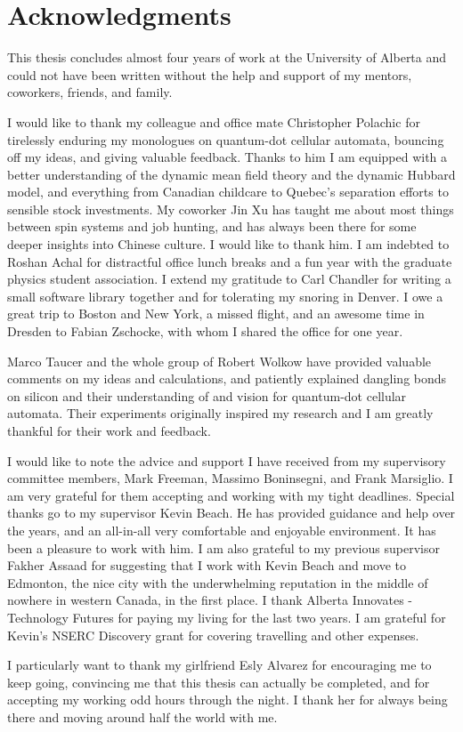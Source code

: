 \chapter*{Acknowledgments}

This thesis concludes almost four years of work at the University of
Alberta and could not have been written without the help and support of my
mentors, coworkers, friends, and family.

I would like to thank my colleague and office mate Christopher Polachic for
tirelessly enduring my monologues on quantum-dot cellular automata, bouncing off
my ideas, and giving valuable feedback. Thanks to him I am equipped with a
better understanding of the dynamic mean field theory and the dynamic Hubbard
model, and everything from Canadian childcare to Quebec's separation efforts to
sensible stock investments.  My coworker Jin Xu has taught me about most things
between spin systems and job hunting, and has always been there for some deeper
insights into Chinese culture. I would like to thank him. I am indebted to
Roshan Achal for distractful office lunch breaks and a fun year with the
graduate physics student association. I extend my gratitude to Carl Chandler for
writing a small software library together and for tolerating my snoring in
Denver. I owe a great trip to Boston and New York, a missed flight, and an
awesome time in Dresden to Fabian Zschocke, with whom I shared the office for
one year.

Marco Taucer and the whole group of Robert Wolkow have provided valuable
comments on my ideas and calculations, and patiently explained dangling
bonds on silicon and their understanding of and vision for quantum-dot cellular
automata. Their experiments originally inspired my research and I am
greatly thankful for their work and feedback.

I would like to note the advice and support I have received from my supervisory
committee members, Mark Freeman, Massimo Boninsegni, and Frank Marsiglio. I am
very grateful for them accepting and working with my tight deadlines. Special
thanks go to my supervisor Kevin Beach. He has provided guidance and help over
the years, and an all-in-all very comfortable and enjoyable environment. It has
been a pleasure to work with him. I am also grateful to my previous supervisor
Fakher Assaad for suggesting that I work with Kevin Beach and move to Edmonton, the
nice city with the underwhelming reputation in the middle of nowhere in western
Canada, in the first place. I thank Alberta Innovates - Technology Futures for
paying my living for the last two years. I am grateful for Kevin's NSERC
Discovery grant for covering travelling and other expenses.

I particularly want to thank my girlfriend Esly Alvarez for encouraging me to
keep going, convincing me that this thesis can actually be completed, and for
accepting my working odd hours through the night. I thank her for always being
there and moving around half the world with me.

